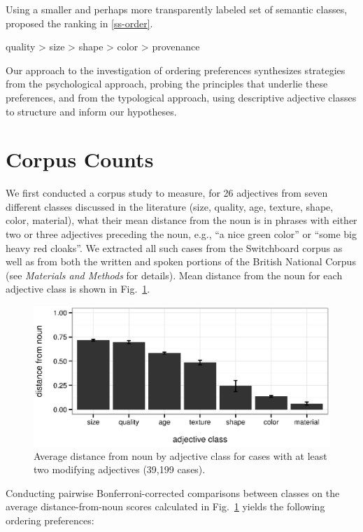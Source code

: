 \documentclass{pnastwo}
\newcommand{\figref}[1]{Fig.~\ref{#1}}
\begin{document}
\begin{article}
Using a smaller and perhaps more transparently labeled set of semantic classes, \cite{sproatshih1991} proposed the ranking in \ref{ss-order}.

\be quality > size > shape > color > provenance\label{ss-order}\ee



Our approach to the investigation of ordering preferences synthesizes strategies from the psychological approach, probing the principles that underlie these preferences, and from the typological approach, using descriptive adjective classes to structure and inform our hypotheses.

\section{Corpus Counts}

We first conducted a corpus study to measure, for 26 adjectives from seven different classes discussed in the literature (size, quality, age, texture, shape, color, material), what their mean distance from the noun is in phrases with either two or three adjectives preceding the noun, e.g., ``a nice green color'' or ``some big heavy red cloaks''. We extracted all such cases from the Switchboard corpus as well as from both the written and spoken portions of the British National Corpus (see \emph{Materials and Methods} for details). Mean distance from the noun for each adjective class is shown in \figref{fig:distance}.

\begin{figure}[h]
	\centering
	\includegraphics[width=.95\linewidth]{plots/corpus_distance_plot.eps}
	\caption{Average distance from noun by adjective class for cases with at least two modifying adjectives (39,199 cases).}\label{distance-from-noun}
	\label{fig:distance}
\end{figure}

Conducting pairwise Bonferroni-corrected comparisons between classes on the average distance-from-noun scores calculated in \figref{fig:distance} yields the following ordering preferences:


\end{article}
\end{document}
